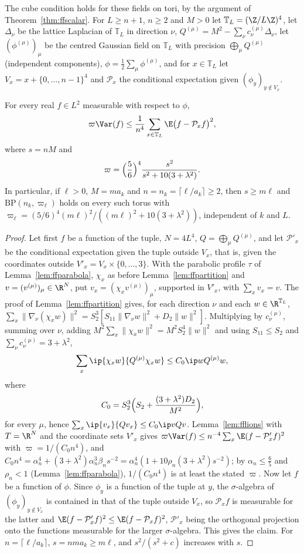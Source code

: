 The cube condition holds for these fields on tori, by the argument of
Theorem~\ref{thm:ffscalar}. For $L\ge n+1$, $n\ge2$ and $M>0$ let
$\mathbb T_L=(\Z/L\Z)^4$, let $\Delta_\nu$ be the lattice Laplacian of
$\mathbb T_L$ in direction $\nu$, $Q^{(\mu)}=M^2-\sum_\nu c^{(\mu)}_\nu
\Delta_\nu$, let $(\phi^{(\mu)})_\mu$ be the centred Gaussian field on
$\mathbb T_L$ with precision $\bigoplus_\mu Q^{(\mu)}$ (independent
components), $\phi=\frac12\sum_\mu\phi^{(\mu)}$, and for $x\in\mathbb T_L$
let $V_x=x+\{0,\dots,n-1\}^4$ and $\mathcal P_x$ the conditional expectation
given $(\phi_y)_{y\notin V_x}$.

\begin{lemma}\label{rN5:bp}
For every real $f\in L^2$ measurable with respect to $\phi$,
\[
\varpi\Var(f)\le\frac1{n^4}\sum_{x\in\mathbb T_L}\E\bigl(f-\mathcal P_xf
\bigr)^2,
\]
where $s=nM$ and
\[
\varpi=\Bigl(\frac56\Bigr)^4\frac{s^2}{s^2+10(3+\lambda^2)} .
\]
In particular, if $\ell>0$, $M=ma_k$ and $n=n_k=\lceil\ell/a_k\rceil\ge2$,
then $s\ge m\ell$ and $\mathrm{BP}(n_k,\varpi_\ell)$ holds on every such
torus with $\varpi_\ell=(5/6)^4(m\ell)^2/((m\ell)^2+10(3+\lambda^2))$,
independent of $k$ and $L$.
\end{lemma}

\begin{proof}
Let first $f$ be a function of the tuple, $N=4L^4$, $Q=\bigoplus_\mu
Q^{(\mu)}$, and let $\mathcal P'_x$ be the conditional expectation given the
tuple outside $V_x$, that is, given the coordinates outside $V'_x=V_x\times
\{0,\dots,3\}$. With the parabolic profile $\tau$ of
Lemma~\ref{lem:ffparabola}, $\chi_x$ as before Lemma~\ref{lem:ffpartition}
and $v=(v^{(\mu)})_\mu\in\R^N$, put $v_x=(\chi_xv^{(\mu)})_\mu$, supported in
$V'_x$, with $\sum_xv_x=v$. The proof of Lemma~\ref{lem:ffpartition} gives,
for each direction $\nu$ and each $w\in\R^{\mathbb T_L}$,
$\sum_x\|\nabla_\nu(\chi_xw)\|^2=S_2^3[S_{11}\|\nabla_\nu w\|^2+D_2\|w\|^2]$.
Multiplying by $c^{(\mu)}_\nu$, summing over $\nu$, adding $M^2\sum_x\|\chi_x
w\|^2=M^2S_2^4\|w\|^2$ and using $S_{11}\le S_2$ and $\sum_\nu c^{(\mu)}_\nu=
3+\lambda^2$,
\[
\sum_x\ip{\chi_xw}{Q^{(\mu)}\chi_xw}\le C_0\ip w{Q^{(\mu)}w},
\]
where
\[
C_0=S_2^3\Bigl(S_2+\frac{(3+\lambda^2)D_2}{M^2}\Bigr),
\]
for every $\mu$, hence $\sum_x\ip{v_x}{Qv_x}\le C_0\ip v{Qv}$.
Lemma~\ref{lem:fflions} with $T=\R^N$ and the coordinate sets $V'_x$ gives
$\varpi\Var(f)\le n^{-4}\sum_x\E(f-\mathcal P'_xf)^2$ with $\varpi=1/(C_0
n^4)$, and $C_0n^4=\alpha_n^4+(3+\lambda^2)\alpha_n^3\beta_ns^{-2}=\alpha_n^4(1+
10\rho_n(3+\lambda^2)s^{-2})$; by $\alpha_n\le\frac65$ and $\rho_n<1$
(Lemma~\ref{lem:ffparabola}), $1/(C_0n^4)$ is at least the stated $\varpi$.
Now let $f$ be a function of $\phi$. Since $\phi_y$ is a function of the
tuple at $y$, the $\sigma$-algebra of $(\phi_y)_{y\notin V_x}$ is contained in
that of the tuple outside $V_x$, so $\mathcal P_xf$ is measurable for the
latter and $\E(f-\mathcal P'_xf)^2\le\E(f-\mathcal P_xf)^2$, $\mathcal P'_x$
being the orthogonal projection onto the functions measurable for the larger
$\sigma$-algebra. This gives the claim. For $n=\lceil\ell/a_k\rceil$,
$s=nma_k\ge m\ell$, and $s^2/(s^2+c)$ increases with $s$.
\end{proof}

